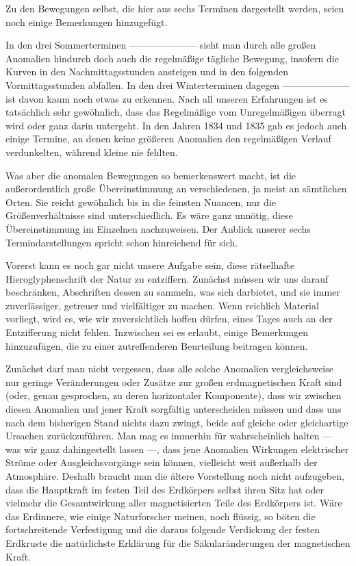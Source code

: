Zu den Bewegungen selbst, die hier aus sechs Terminen dargestellt werden, seien noch einige Bemerkungen hinzugefügt.

In den drei Sommerterminen ---\quad---\quad---\quad---\quad---\quad---\quad--- sieht man durch alle großen Anomalien hindurch doch auch die regelmäßige tägliche Bewegung, insofern die Kurven in den Nachmittagsstunden ansteigen und in den folgenden Vormittagsstunden abfallen. In den drei Winterterminen dagegen ---\quad---\quad---\quad---\quad---\quad---\quad--- ist davon kaum noch etwas zu erkennen. Nach all unseren Erfahrungen ist es tatsächlich sehr gewöhnlich, dass das Regelmäßige vom Unregelmäßigen überragt wird oder ganz darin untergeht. In den Jahren 1834 und 1835 gab es jedoch auch einige Termine, an denen keine größeren Anomalien den regelmäßigen Verlauf verdunkelten, während kleine nie fehlten.

Was aber die anomalen Bewegungen so bemerkenswert macht, ist die außerordentlich große Übereinstimmung an verschiedenen, ja meist an sämtlichen Orten. Sie reicht gewöhnlich bis in die feinsten Nuancen, nur die Größenverhältnisse sind unterschiedlich. Es wäre ganz unnötig, diese Übereinstimmung im Einzelnen nachzuweisen. Der Anblick unserer sechs Termindarstellungen spricht schon hinreichend für sich.

Vorerst kann es noch gar nicht unsere Aufgabe sein, diese rätselhafte Hieroglyphenschrift der Natur zu entziffern. Zunächst müssen wir uns darauf beschränken, Abschriften dessen zu sammeln, was sich darbietet, und sie immer zuverlässiger, getreuer und vielfältiger zu machen. Wenn reichlich Material vorliegt, wird es, wie wir zuversichtlich hoffen dürfen, eines Tages auch an der Entzifferung nicht fehlen. Inzwischen sei es erlaubt, einige Bemerkungen hinzuzufügen, die zu einer zutreffenderen Beurteilung beitragen können.

Zunächst darf man nicht vergessen, dass alle solche Anomalien vergleichsweise nur geringe Veränderungen oder Zusätze zur großen erdmagnetischen Kraft sind (oder, genau gesprochen, zu deren horizontaler Komponente), dass wir zwischen diesen Anomalien und jener Kraft sorgfältig unterscheiden müssen und dass uns nach dem bisherigen Stand nichts dazu zwingt, beide auf gleiche oder gleichartige Ursachen zurückzuführen. Man mag es immerhin für wahrscheinlich halten --- was wir ganz dahingestellt lassen ---, dass jene Anomalien Wirkungen elektrischer Ströme oder Ausgleichsvorgänge sein können, vielleicht weit außerhalb der Atmosphäre. Deshalb braucht man die ältere Vorstellung noch nicht aufzugeben, dass die Hauptkraft im festen Teil des Erdkörpers selbst ihren Sitz hat oder vielmehr die Gesamtwirkung aller magnetisierten Teile des Erdkörpers ist. Wäre das Erdinnere, wie einige Naturforscher meinen, noch flüssig, so böten die fortschreitende Verfestigung und die daraus folgende Verdickung der festen Erdkruste die natürlichste Erklärung für die Säkularänderungen der magnetischen Kraft.

